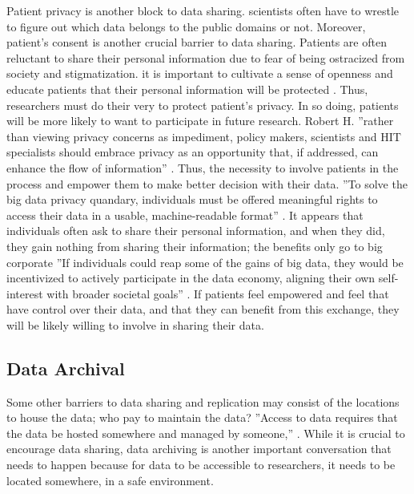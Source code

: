 \documentclass[sigconf]{acmart}
\begin{document}
Patient privacy is another block to data sharing. scientists often have to wrestle to figure out which data belongs to the public domains or not. Moreover, patient's consent is another crucial barrier to data sharing. Patients are often reluctant to share their personal information due to fear of being ostracized from society and stigmatization. it is important to cultivate a sense of openness and educate patients that their personal information will be protected \cite{yozwiak2015data}. Thus, researchers must do their very to protect patient's privacy. In so doing, patients will be more likely to want to participate in future research. Robert H. ''rather than viewing privacy concerns as impediment, policy makers, scientists and HIT specialists should embrace privacy as an opportunity that, if addressed, can enhance the flow of information'' \cite{shelton2011electronic}. Thus, the necessity to involve patients in the process and empower them to make better decision with their data. ''To solve the big data privacy quandary, individuals must be offered meaningful rights to access their data in a usable, machine-readable format'' \cite{tene2012big}. It appears that individuals often ask to share their personal information, and when they did, they gain nothing from sharing their information; the benefits only go to big corporate ''If individuals could reap some of the gains of big data, they would be incentivized to actively participate in the data economy, aligning their own self-interest with broader societal goals'' \cite{tene2012big}. If patients feel empowered and feel that have control over their data, and that they can benefit from this exchange, they will be likely willing to involve in sharing their data.


\subsection{Data Archival}

Some other barriers to data sharing and replication may consist of the locations to house the data; who pay to maintain the data? ''Access to data requires that the data be hosted somewhere and managed by someone,'' \cite{berman2013will}. While it is crucial to encourage data sharing, data archiving is another important conversation that needs to happen because for data to be accessible to researchers, it needs to be located somewhere, in a safe environment. 
\end{document}
